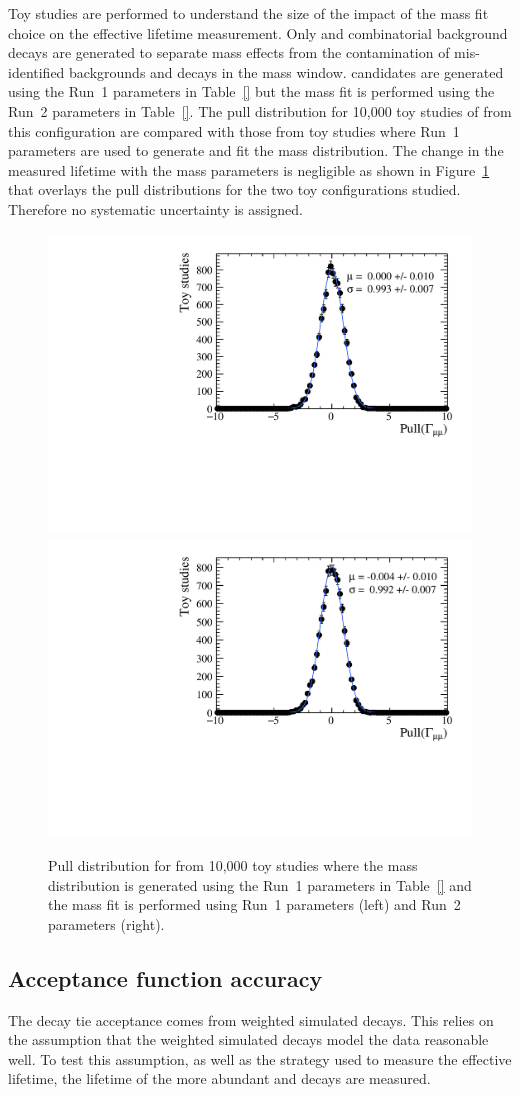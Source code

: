 Toy studies are performed to understand the size of the impact of the mass fit choice on the effective lifetime measurement. Only \bsmumu and combinatorial background decays are generated to separate mass \pdf effects from the contamination of mis-identified backgrounds and \bdmumu decays in the mass window. \bsmumu candidates are generated using the Run~1 parameters in Table~\ref{} but the mass fit is performed using the Run~2 parameters in Table~\ref{}. The pull distribution for 10,000 toy studies of \Gmumu from this configuration are compared with those from toy studies where Run~1 parameters are used to generate and fit the mass distribution. The change in the measured lifetime with the mass \pdf parameters is negligible as shown in Figure~\ref{fig:masspdfsyst} that overlays the pull distributions for the two toy configurations studied. Therefore no systematic uncertainty is assigned. 

\begin{figure}[htbp]
    \centering
        \includegraphics[width=0.49 \textwidth]{./Figs/LifetimeSystematics/Gamma_pull_mass_pdf_Run1.pdf}
        \includegraphics[width=0.49 \textwidth]{./Figs/LifetimeSystematics/Gamma_pull_mass_pdf_Run2.pdf}
    \caption{Pull distribution for \Gmumu from 10,000 toy studies where the \bsmumu mass distribution is generated using the Run~1 parameters in Table~\ref{} and the mass fit is performed using Run~1 parameters (left) and Run~2 parameters (right).}
    \label{fig:masspdfsyst}
\end{figure}


\subsection{Acceptance function accuracy}
\label{sec:accptsyst}
The decay tie acceptance comes from weighted simulated decays. This relies on the assumption that the weighted simulated decays model the data reasonable well. To test this assumption, as well as the strategy used to measure the \bsmumu effective lifetime, the lifetime of the more abundant \bdkpi and \bskk decays are measured.

